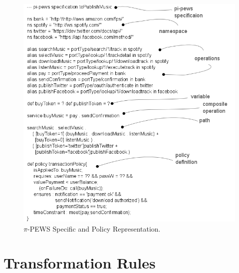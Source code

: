 \documentclass{singlecol-new}
\theoremstyle{TH}{
\newtheorem{lemma}{Lemma}
\newtheorem{theorem}[lemma]{Theorem}
\newtheorem{corrolary}[lemma]{Corrolary}
\newtheorem{conjecture}[lemma]{Conjecture}
\newtheorem{proposition}[lemma]{Proposition}
\newtheorem{claim}[lemma]{Claim}
\newtheorem{stheorem}[lemma]{Wrong Theorem}
\newtheorem{algorithm}{Algorithm}
}
\theoremstyle{THrm}{
\newtheorem{definition}{Definition}[section]
\newtheorem{question}{Question}[section]
\newtheorem{remark}{Remark}
\newtheorem{scheme}{Scheme}
}
\theoremstyle{THhit}{
\newtheorem{case}{Case}[section]
}
\theoremstyle{THhsl}{
\newtheorem{example}{Example}
}
\begin{document}
\begin{figure}[h]
\centering
\includegraphics[width=1\textwidth]{./figures/pi-pewsSpecification-toPublishMusic}
\caption{$\pi$-PEWS Specific and Policy Representation.}
\label{fig:Specific-Contract-Representation}
\end{figure}


\section{Transformation Rules}\label{sec:mmrules}


\end{document}
